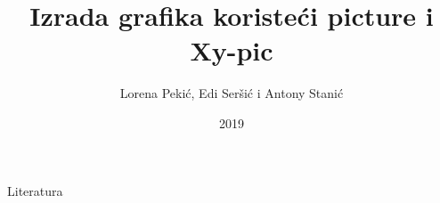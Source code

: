 \documentclass[17p]{beamer}
\title{Izrada grafika koristeći picture i Xy-pic}
\author{Lorena Pekić, Edi Seršić i Antony Stanić}
\date{2019}
\begin{document}
\frame{\titlepage}


%
%
%

\begin{frame}[shrink=20]{Literatura}


\nocite{IZVOR:1,IZVOR:2,IZVOR:3,IZVOR:4,IZVOR:5,IZVOR:6}

\end{frame}
\end{document}
